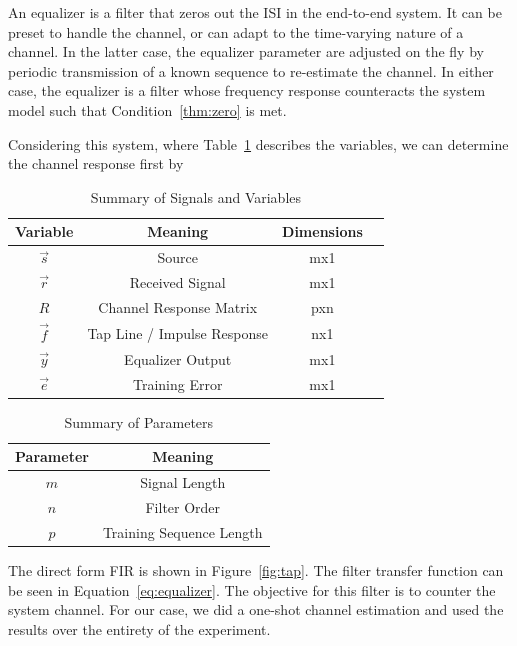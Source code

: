 \documentclass[]{article}
\begin{document}
An equalizer is a filter that zeros out the ISI in the end-to-end system.  It can be preset to handle the channel, or can adapt to the time-varying nature of a channel.  In the latter case, the equalizer parameter are adjusted on the fly by periodic transmission of a known sequence to re-estimate the channel.  In either case, the equalizer is a filter whose frequency response counteracts the system model such that Condition~\ref{thm:zero} is met.  

Considering this system, where Table~\ref{tab:filtersummary} describes the variables, we can determine the channel response first by 

\begin{table}[H]
\begin{center}
\begin{tabular}{|c|c|c|c|}
\hline Variable & Meaning & Dimensions \\
\hline \hline
$\vec{s}$ & Source & mx1 \\ \hline
$\vec{r}$ & Received Signal & mx1 \\ \hline
$R$ & Channel Response Matrix & pxn \\ \hline
$\vec{f}$ & Tap Line / Impulse Response & nx1 \\ \hline
$\vec{y}$ & Equalizer Output & mx1  \\ \hline
 $\vec{e}$ & Training Error & mx1 \\ \hline
\end{tabular}
\caption{Summary of Signals and Variables} \label{tab:filtersummary}
\end{center}
\end{table}

\begin{table}[H]
\begin{center}
\begin{tabular}{|c|c|}
\hline Parameter & Meaning \\
\hline \hline
$m$ & Signal Length \\ \hline
$n$ & Filter Order \\ \hline
$p$ & Training Sequence Length \\ \hline
\end{tabular}
\caption{Summary of Parameters} \label{tab:Paramsummary}
\end{center}
\end{table}

The direct form FIR is shown in Figure~\ref{fig:tap}.  The filter transfer function can be seen in Equation~\ref{eq:equalizer}.  The objective for this filter is to counter the system channel.  For our case, we did a one-shot channel estimation and used the results over the entirety of the experiment.  \\
\end{document}
